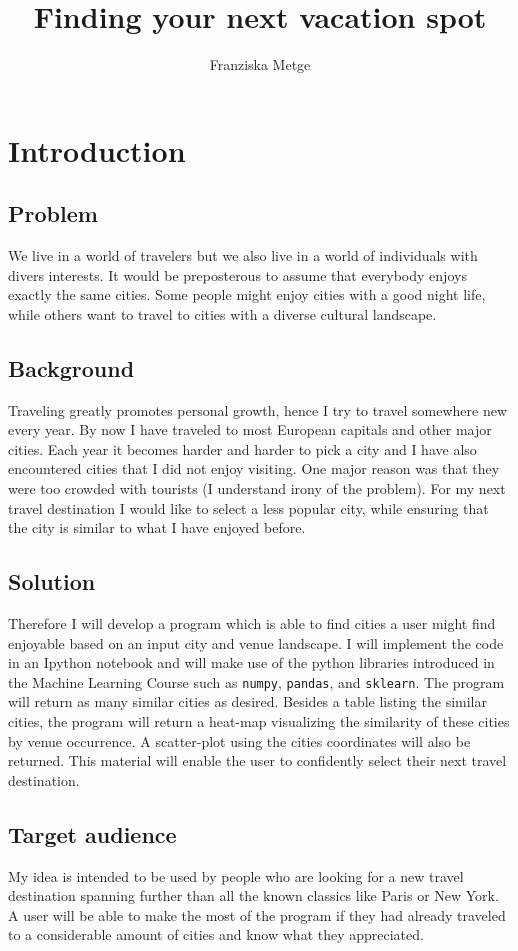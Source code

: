 \documentclass[11pt,a4paper,final]{article}
\author{Franziska Metge}
\title{Finding your next vacation spot}
\begin{document}
\maketitle
\section{Introduction}
\subsection*{Problem}
We live in a world of travelers but we also live in a world of individuals with divers interests. It would be preposterous to assume that everybody enjoys exactly the same cities. Some people might enjoy cities with a good night life, while others want to travel to cities with a diverse cultural landscape. 

\subsection*{Background}
Traveling greatly promotes personal growth, hence I try to travel somewhere new every year. By now I have traveled to most European capitals and other major cities. Each year it becomes harder and harder to pick a city and I have also encountered cities that I did not enjoy visiting. One major reason was that they were too crowded with tourists (I understand irony of the problem). For my next travel destination I would like to select a less popular city, while ensuring that the city is similar to what I have enjoyed before. 

\subsection*{Solution}
Therefore I will develop a program which is able to find cities a user might find enjoyable based on an input city and venue landscape. I will implement the code in an Ipython notebook and will make use of the python libraries introduced in the Machine Learning Course such as \texttt{numpy}, \texttt{pandas}, and \texttt{sklearn}. The program will return as many similar cities as desired. Besides a table listing the similar cities, the program will return a heat-map visualizing the similarity of these cities by venue occurrence. A scatter-plot using the cities coordinates will also be returned. This material will enable the user to confidently select their next travel destination.

\subsection*{Target audience}
My idea is intended to be used by people who are looking for a new travel destination spanning further than all the known classics like Paris or New York. A user will be able to make the most of the program if they had already traveled to a considerable amount of cities and know what they appreciated. 
\end{document}
